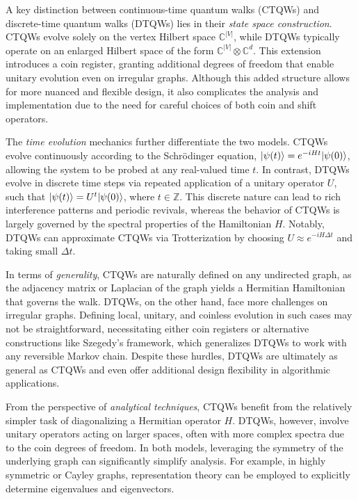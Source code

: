 \documentclass[12pt]{report}
\begin{document}
A key distinction between continuous-time quantum walks (CTQWs) and discrete-time quantum walks (DTQWs) lies in their \textit{state space construction}. CTQWs evolve solely on the vertex Hilbert space $\mathbb{C}^{|V|}$, while DTQWs typically operate on an enlarged Hilbert space of the form $\mathbb{C}^{|V|} \otimes \mathbb{C}^d$. This extension introduces a coin register, granting additional degrees of freedom that enable unitary evolution even on irregular graphs. Although this added structure allows for more nuanced and flexible design, it also complicates the analysis and implementation due to the need for careful choices of both coin and shift operators.

The \textit{time evolution} mechanics further differentiate the two models. CTQWs evolve continuously according to the Schrödinger equation, $\lvert\psi(t)\rangle = e^{-iHt} \lvert\psi(0)\rangle$, allowing the system to be probed at any real-valued time $t$. In contrast, DTQWs evolve in discrete time steps via repeated application of a unitary operator $U$, such that $\lvert\psi(t)\rangle = U^t \lvert\psi(0)\rangle$, where $t \in \mathbb{Z}$. This discrete nature can lead to rich interference patterns and periodic revivals, whereas the behavior of CTQWs is largely governed by the spectral properties of the Hamiltonian $H$. Notably, DTQWs can approximate CTQWs via Trotterization by choosing $U \approx e^{-iH \Delta t}$ and taking small $\Delta t$.

In terms of \textit{generality}, CTQWs are naturally defined on any undirected graph, as the adjacency matrix or Laplacian of the graph yields a Hermitian Hamiltonian that governs the walk. DTQWs, on the other hand, face more challenges on irregular graphs. Defining local, unitary, and coinless evolution in such cases may not be straightforward, necessitating either coin registers or alternative constructions like Szegedy’s framework, which generalizes DTQWs to work with any reversible Markov chain. Despite these hurdles, DTQWs are ultimately as general as CTQWs and even offer additional design flexibility in algorithmic applications.

From the perspective of \textit{analytical techniques}, CTQWs benefit from the relatively simpler task of diagonalizing a Hermitian operator $H$. DTQWs, however, involve unitary operators acting on larger spaces, often with more complex spectra due to the coin degrees of freedom. In both models, leveraging the symmetry of the underlying graph can significantly simplify analysis. For example, in highly symmetric or Cayley graphs, representation theory can be employed to explicitly determine eigenvalues and eigenvectors.
\end{document}
